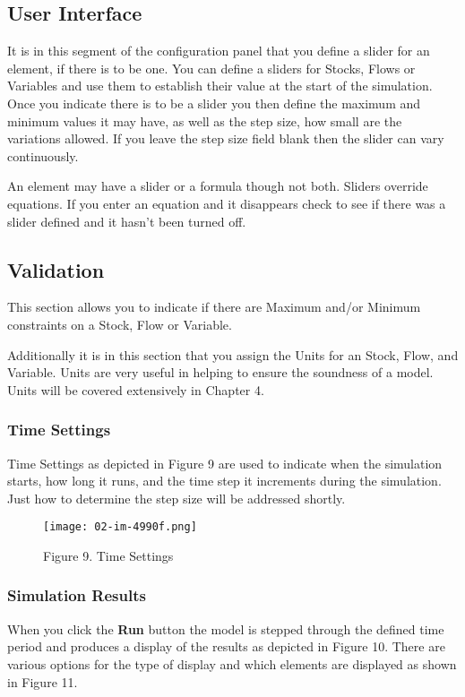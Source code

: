 \documentclass[]{memoir}
\let\Oldincludegraphics\includegraphics
\renewcommand{\includegraphics}[1]{\Oldincludegraphics[max size={\textwidth}{\textheight}]{#1}}
\renewcommand{\u}[1]{\textbf{#1}}
\begin{document}
\subsection{User Interface}

It is in this segment of the configuration panel that you define a
slider for an element, if there is to be one. You can define a sliders
for Stocks, Flows or Variables and use them to establish their value at
the start of the simulation. Once you indicate there is to be a slider
you then define the maximum and minimum values it may have, as well as
the step size, how small are the variations allowed. If you leave the
step size field blank then the slider can vary continuously.

An element may have a slider or a formula though not both. Sliders
override equations. If you enter an equation and it disappears check to
see if there was a slider defined and it hasn't been turned off.

\subsection{Validation}

This section allows you to indicate if there are Maximum and/or Minimum
constraints on a Stock, Flow or Variable.

Additionally it is in this section that you assign the Units for an
Stock, Flow, and Variable. Units are very useful in helping to ensure
the soundness of a model. Units will be covered extensively in Chapter
4.

\subsubsection{Time Settings}

Time Settings as depicted in Figure 9 are used to indicate when the
simulation starts, how long it runs, and the time step it increments
during the simulation. Just how to determine the step size will be
addressed shortly.

\begin{figure}[htbp]
\centering
\texttt{[image: 02-im-4990f.png]}
\caption{Figure 9. Time Settings}
\end{figure}

\subsubsection{Simulation Results}

When you click the \u{Run} button the model is stepped through the
defined time period and produces a display of the results as depicted in
Figure 10. There are various options for the type of display and which
elements are displayed as shown in Figure 11.
\end{document}
